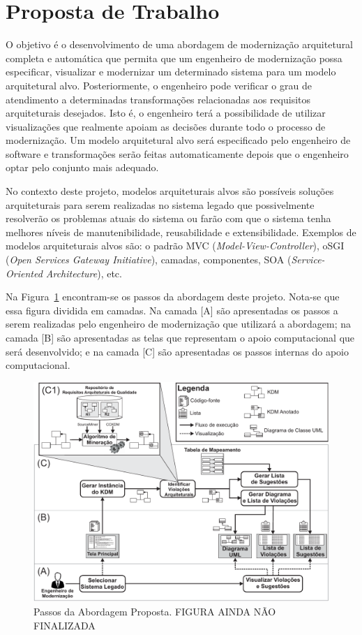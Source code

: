 \documentclass[12pt]{article}
\begin{document}
\section{Proposta de Trabalho}\label{sec:proposta_de_trabalho}

O objetivo é o desenvolvimento de uma abordagem de modernização arquitetural completa e automática que permita que um engenheiro de modernização possa especificar, visualizar e modernizar um determinado sistema para um modelo arquitetural alvo. Posteriormente, o engenheiro pode verificar o grau de atendimento a determinadas transformações relacionadas aos requisitos arquiteturais desejados. Isto é, o engenheiro terá a possibilidade de utilizar visualizações que realmente apoiam as decisões durante todo o processo de modernização. Um modelo arquitetural alvo será especificado pelo engenheiro de software e transformações serão feitas automaticamente depois que o engenheiro optar pelo conjunto mais adequado.

No contexto deste projeto, modelos arquiteturais alvos são possíveis soluções arquiteturais para serem realizadas no sistema legado que possivelmente resolverão os problemas atuais do sistema ou farão com que o sistema tenha melhores níveis de manutenibilidade, reusabilidade e extensibilidade. Exemplos de modelos arquiteturais alvos são: o padrão MVC (\textit{Model-View-Controller}), oSGI (\textit{Open Services Gateway Initiative}), camadas, componentes, SOA (\textit{Service-Oriented Architecture}), etc.

Na Figura~\ref{fig:approach_steps} encontram-se os passos da abordagem deste projeto. Nota-se que essa figura dividida em camadas. Na camada [A] são apresentadas os passos a serem realizadas pelo engenheiro de modernização que utilizará a abordagem; na camada [B] são apresentadas as telas que representam o apoio computacional que será desenvolvido; e na camada [C] são apresentadas os passos internas do apoio computacional.

\begin{figure}[htb]
 \caption{Passos da Abordagem Proposta. FIGURA AINDA NÃO FINALIZADA}
 \label{fig:approach_steps}
 \centering
 \includegraphics[scale=0.77]{abordagemSteps.pdf}
\end{figure}
\end{document}
